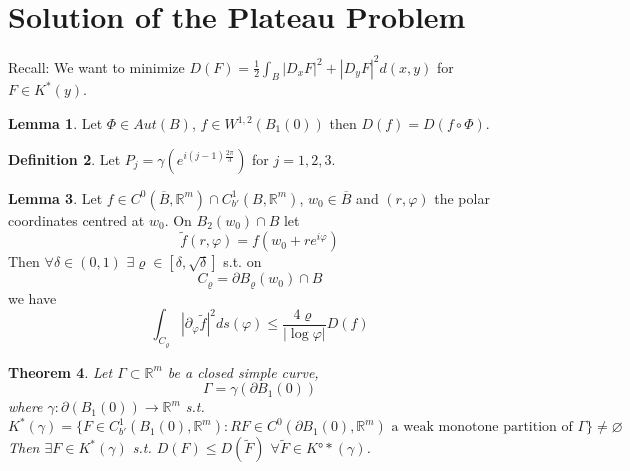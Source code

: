 \documentclass[a4paper, 12pt]{article}
\theoremstyle{plain}
\newtheorem{theorem}{Theorem}[section] %
\theoremstyle{definition}
\newtheorem{definition}[theorem]{Definition} %
\theoremstyle{lemma}
\newtheorem{lemma}[theorem]{Lemma}
\theoremstyle{remark}
\theoremstyle{corollary}
\theoremstyle{example}
\begin{document}
	\section{Solution of the Plateau Problem}
	Recall: We want to minimize $D(F) = \frac{1}{2}\int_B \left|D_x F\right|^2 + \left|D_y F\right|^2 d(x,y)$ for $F \in K^*(y)$.\\
	\begin{lemma}
		Let $\Phi \in Aut(B)$, $f \in W^{1,2}(B_1(0))$ then $D(f) = D(f\circ \Phi)$.
	\end{lemma}
	\begin{definition}
		Let $P_j = \gamma(e^{i(j-1)\frac{2\pi}{3}})$ for $j=1,2,3$.
	\end{definition}
	\begin{lemma}
		Let $f \in C^0(\overline{B}, \mathbb{R}^m)\cap C^1_{b'}(B, \mathbb{R}^m)$, $w_0 \in \overline{B}$ and $(r,\varphi)$ the polar coordinates centred at $w_0$. On $B_2(w_0) \cap B$ let \[\tilde{f}(r,\varphi) = f(w_0 + re^{i\varphi})\] Then $\forall \delta \in (0,1)$ $\exists \varrho \in [\delta, \sqrt{\delta}]$ s.t. on \[C_\varrho = \partial B_\varrho(w_0) \cap B\] we have \[\int_{C_\varrho} \left|\partial_\varphi \tilde{f}\right|^2 ds(\varphi) \leq \frac{4\varrho}{\left|\log \varphi\right|} D(f)\]
	\end{lemma}
	\begin{theorem}
		Let $\Gamma \subset \mathbb{R}^m$ be a closed simple curve, \[\Gamma = \gamma(\partial B_1(0))\] where $\gamma: \partial(B_1(0)) \to \mathbb{R}^m$ s.t. \[K^*(\gamma) = \{F \in C^1_{b'}(B_1(0),\mathbb{R}^m) : RF \in C^0(\partial B_1(0), \mathbb{R}^m) \text{ a weak monotone partition of } \Gamma\} \neq \varnothing\]
		Then $\exists F \in K^*(\gamma)$ s.t. $D(F) \leq D(\tilde{F})$ $\forall \tilde{F} \in K°*(\gamma)$.
	\end{theorem}
\end{document}
